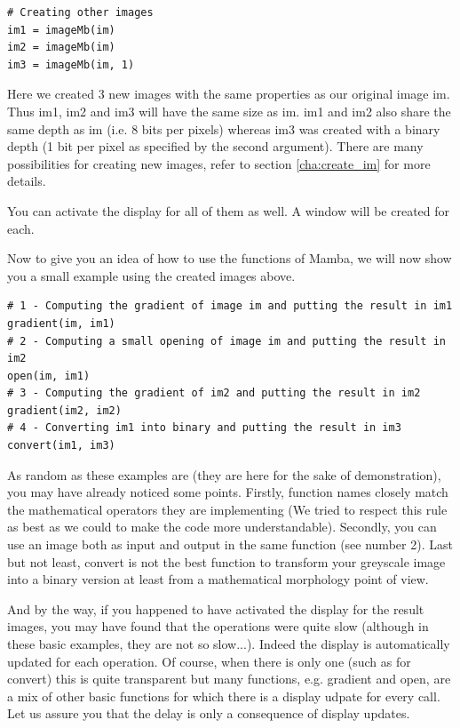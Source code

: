\documentclass[a4paper,10pt,oneside]{article}
\begin{document}
\lstset{language=Python}
\begin{lstlisting}
# Creating other images
im1 = imageMb(im)
im2 = imageMb(im)
im3 = imageMb(im, 1)
\end{lstlisting}

Here we created 3 new images with the same properties as our original image im.
Thus im1, im2 and im3 will have the same size as im. im1 and im2 also share 
the same depth as im (i.e. 8 bits per pixels) whereas im3 was created with a 
binary depth (1 bit per pixel as specified by the second argument). There are many
possibilities for creating new images, refer to section \ref{cha:create_im} for
more details.

You can activate the display for all of them as well. A window will be created
for each.

Now to give you an idea of how to use the functions of Mamba, we will now show
you a small example using the created images above.

\lstset{language=Python}
\begin{lstlisting}
# 1 - Computing the gradient of image im and putting the result in im1
gradient(im, im1)
# 2 - Computing a small opening of image im and putting the result in im2
open(im, im1)
# 3 - Computing the gradient of im2 and putting the result in im2
gradient(im2, im2)
# 4 - Converting im1 into binary and putting the result in im3
convert(im1, im3)
\end{lstlisting}

As random as these examples are (they are here for the sake of demonstration),
you may have already noticed some points. Firstly, function names closely
match the mathematical operators they are implementing (We tried to respect this
rule as best as we could to make the code more understandable). Secondly, you can
use an image both as input and output in the same function (see number 2). Last
but not least, convert is not the best function to transform your greyscale image into
a binary version at least from a mathematical morphology point of view.

And by the way, if you happened to have activated the display for the result
images, you may have found that the operations were quite slow (although in these 
basic examples, they are not so slow...). Indeed the 
display is automatically updated for each operation. Of course, when there is
only one (such as for convert) this is quite transparent but many functions, 
e.g. gradient and open, are a mix of other basic functions for which there is
a display udpate for every call. Let us assure you that the delay is only a
consequence of display updates.
\end{document}
